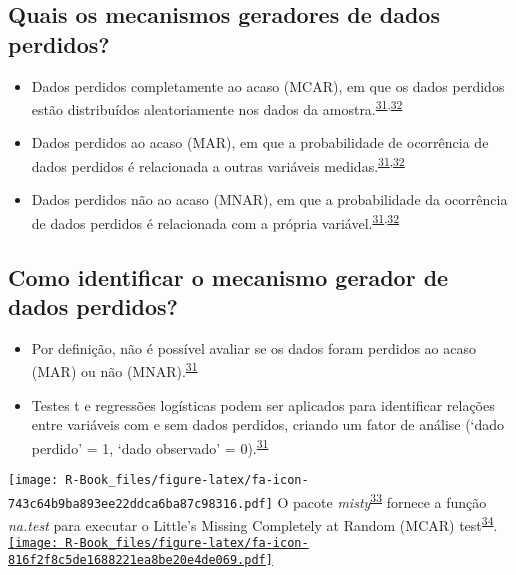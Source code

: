 \documentclass[
]{book}
\begin{document}
\hypertarget{quais-os-mecanismos-geradores-de-dados-perdidos}{%
\subsection{Quais os mecanismos geradores de dados perdidos?}\label{quais-os-mecanismos-geradores-de-dados-perdidos}}

\begin{itemize}
\item
  Dados perdidos completamente ao acaso (MCAR), em que os dados perdidos estão distribuídos aleatoriamente nos dados da amostra.\textsuperscript{\protect\hyperlink{ref-Heymans2022}{31},\protect\hyperlink{ref-carpenter2021}{32}}
\item
  Dados perdidos ao acaso (MAR), em que a probabilidade de ocorrência de dados perdidos é relacionada a outras variáveis medidas.\textsuperscript{\protect\hyperlink{ref-Heymans2022}{31},\protect\hyperlink{ref-carpenter2021}{32}}
\item
  Dados perdidos não ao acaso (MNAR), em que a probabilidade da ocorrência de dados perdidos é relacionada com a própria variável.\textsuperscript{\protect\hyperlink{ref-Heymans2022}{31},\protect\hyperlink{ref-carpenter2021}{32}}
\end{itemize}

\hypertarget{como-identificar-o-mecanismo-gerador-de-dados-perdidos}{%
\subsection{Como identificar o mecanismo gerador de dados perdidos?}\label{como-identificar-o-mecanismo-gerador-de-dados-perdidos}}

\begin{itemize}
\item
  Por definição, não é possível avaliar se os dados foram perdidos ao acaso (MAR) ou não (MNAR).\textsuperscript{\protect\hyperlink{ref-Heymans2022}{31}}
\item
  Testes t e regressões logísticas podem ser aplicados para identificar relações entre variáveis com e sem dados perdidos, criando um fator de análise (`dado perdido' = 1, `dado observado' = 0).\textsuperscript{\protect\hyperlink{ref-Heymans2022}{31}}
\end{itemize}

\texttt{[image: R-Book\_files/figure-latex/fa-icon-743c64b9ba893ee22ddca6ba87c98316.pdf]} O pacote \emph{misty}\textsuperscript{\protect\hyperlink{ref-misty}{33}} fornece a função \emph{na.test} para executar o Little's Missing Completely at Random (MCAR) test\textsuperscript{\protect\hyperlink{ref-little1988}{34}}. \href{https://cran.r-project.org/web/packages/misty/index.html}{\texttt{[image: R-Book\_files/figure-latex/fa-icon-816f2f8c5de1688221ea8be20e4de069.pdf]}}
\end{document}
